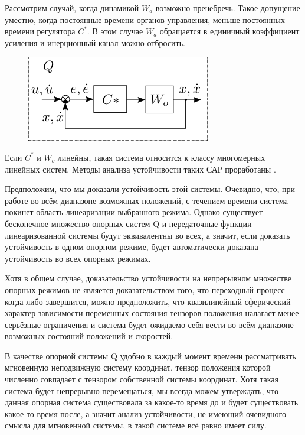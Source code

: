 \documentclass[a4paper]{article}
\begin{document}
Рассмотрим случай, когда динамикой $W_d$ возможно пренебречь. Такое допущение уместно, когда постоянные времени органов управления, меньше постоянных времени регулятора $C^*$. В этом случае $W_{d}$ обращается в единичный коэффициент усиления и инерционный канал можно отбросить. 

{
\begin{figure}[H]
\centering
\includegraphics{./src/sheme4.png}
\end{figure}
}

Если $C^*$ и $W_o$ линейны, такая система относится к классу многомерных линейных систем. Методы анализа устойчивости таких САР проработаны \cite{tau}.

Предположим, что мы доказали устойчивость этой системы. Очевидно, что, при работе во всём диапазоне возможных положений, с течением времени система покинет область линеаризации выбранного режима. Однако существует бесконечное множество опорных систем Q и передаточные функции линеаризованной системы будут эквивалентны во всех, а значит, если доказать устойчивость в одном опорном режиме, будет автоматически доказана устойчивость во всех опорных режимах. 

Хотя в общем случае, доказательство устойчивости на непрерывном множестве опорных режимов не является доказательством того, что переходный процесс когда-либо завершится, можно предположить, что квазилинейный сферический характер зависимости переменных состояния тензоров положения налагает менее серьёзные ограничения и система будет ожидаемо себя вести во всём диапазоне возможных состояний положений и скоростей.

В качестве опорной системы Q удобно в каждый момент времени рассматривать мгновенную неподвижную систему координат, тензор положения которой численно совпадает с тензором собственной системы координат. Хотя такая система будет непрерывно перемещаться, мы всегда можем утверждать, что данная опорная система существовала за какое-то время до и будет существовать какое-то время после, а значит анализ устойчивости, не имеющий очевидного смысла для мгновенной системы, в такой системе всё равно имеет силу. 
\end{document}
